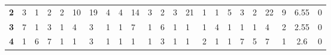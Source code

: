 \begin{table}[t]
\begin{adjustbox}{width=\textwidth}
\begin{tabular}{|c|llllllllllllllllllll|c|c|}
\textbf{2}           & {\color{blue} 3}  & {\color{blue} 1}                      & {\color{blue} 2}                      & {\color{blue} 2}                      & {\color{blue} 10}                     & {\color{blue} 19}                     & {\color{blue} 4}  & {\color{blue} 4}                      & {\color{blue} 14}                     & {\color{blue} 3}                      & {\color{blue} 2}                      & {\color{blue} 3}                      & {\color{blue} 21}                     & {\color{blue} 1}                      & {\color{blue} 1}                      & {\color{blue} 5}                      & {\color{blue} 3}                      & {\color{blue} 2}                      & {\color{blue} 22}                     & {\color{blue} 9}                      & 6.55                                                & 0                                                   \\
\textbf{3}           & {\color{blue} 7}  & {\color{blue} 1}                      & {\color{blue} 3}                      & {\color{blue} 1}                      & {\color{blue} 4}                      & {\color{blue} 3}                      & {\color{blue} 1}  & {\color{blue} 1}                      & {\color{blue} 7}                      & {\color{blue} 1}                      & {\color{blue} 6}                      & {\color{blue} 1}                      & {\color{blue} 1}                      & {\color{blue} 1}                      & {\color{blue} 4}                      & {\color{blue} 1}                      & {\color{blue} 1}                      & {\color{blue} 1}                      & {\color{blue} 4}                      & {\color{blue} 2}                      & 2.55                                                & 0                                                   \\
\textbf{4}           & {\color{blue} 1}  & {\color{blue} 6}                      & {\color{blue} 7}                      & {\color{blue} 1}                      & {\color{blue} 1}                      & {\color{blue} 3}                      & {\color{blue} 1}  & {\color{blue} 1}                      & {\color{blue} 1}                      & {\color{blue} 1}                      & {\color{blue} 3}                      & {\color{blue} 1}                      & {\color{blue} 1}                      & {\color{blue} 2}                      & {\color{blue} 1}                      & {\color{blue} 1}                      & {\color{blue} 7}                      & {\color{blue} 5}                      & {\color{blue} 7}                      & {\color{blue} 1}                      & 2.6                                                 & 0                                                   \\

\end{tabular}
\end{adjustbox}
\end{table}
